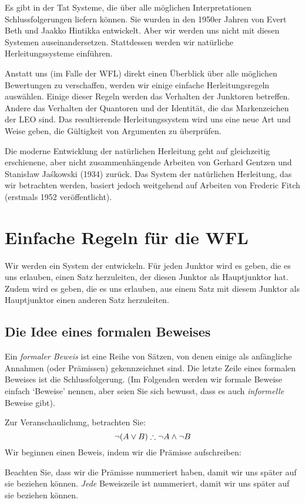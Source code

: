 Es gibt in der Tat Systeme, die über alle möglichen Interpretationen Schlussfolgerungen liefern können. Sie wurden in den 1950er Jahren von Evert Beth und Jaakko Hintikka entwickelt. Aber wir werden uns nicht mit diesen Systemen auseinandersetzen. Stattdessen werden wir natürliche Herleitungssysteme einführen. 

Anstatt uns (im Falle der WFL) direkt einen Überblick über alle möglichen Bewertungen zu verschaffen, werden wir einige einfache Herleitungsregeln auswählen. Einige dieser Regeln werden das Verhalten der Junktoren betreffen. Andere das Verhalten der Quantoren und der Identität, die das Markenzeichen der LEO sind. Das resultierende Herleitungssystem wird uns eine neue Art und Weise geben, die Gültigkeit von Argumenten zu überprüfen. 

Die moderne Entwicklung der natürlichen Herleitung geht auf gleichzeitig erschienene, aber nicht zusammenhängende Arbeiten von Gerhard Gentzen und Stanis\l{}aw Ja\'{s}kowski (1934) zurück. Das System der natürlichen Herleitung, das wir betrachten werden, basiert jedoch weitgehend auf Arbeiten von Frederic Fitch (erstmals 1952 veröffentlicht). 

\chapter{Einfache Regeln für die WFL}\label{s:BasicTFL}
Wir werden ein System der  entwickeln. Für jeden Junktor wird es  geben, die es uns erlauben, einen Satz herzuleiten, der diesen Junktor als Hauptjunktor hat. Zudem wird es  geben, die es uns erlauben, aus einem Satz mit diesem Junktor als Hauptjunktor einen anderen Satz herzuleiten.

\section{Die Idee eines formalen Beweises}
Ein \emph{formaler Beweis} ist eine Reihe von Sätzen, von denen einige als anfängliche Annahmen (oder Prämissen) gekennzeichnet sind. Die letzte Zeile eines formalen Beweises ist die Schlussfolgerung. (Im Folgenden werden wir formale Beweise einfach `Beweise' nennen, aber seien Sie sich bewusst, dass es auch \emph{informelle} Beweise gibt).

Zur Veranschaulichung, betrachten Sie:
	$$\enot (A \eor B) \therefore \enot A \eand \enot B$$
Wir beginnen einen Beweis, indem wir die Prämisse aufschreiben:
\begin{fitchproof}
\end{fitchproof}
Beachten Sie, dass wir die Prämisse nummeriert haben, damit wir uns später auf sie beziehen können. \emph{Jede} Beweiszeile ist nummeriert, damit wir uns später auf sie beziehen können. 

